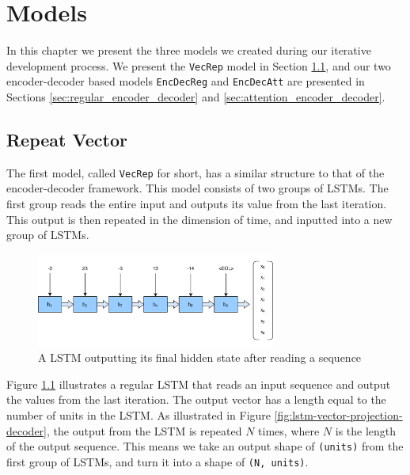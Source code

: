 
\chapter{Models}
\label{ch:models}
In this chapter we present the three models we created during our iterative development process. We present the {\tt VecRep} model in Section \ref{sec:repeat_vector}, and our two encoder-decoder based models {\tt EncDecReg} and {\tt EncDecAtt} are presented in Sections \ref{sec:regular_encoder_decoder} and \ref{sec:attention_encoder_decoder}.


\section{Repeat Vector}
\label{sec:repeat_vector}
The first model, called {\tt VecRep} for short, has a similar structure to that of the encoder-decoder framework. This model consists of two groups of LSTMs. The first group reads the entire input and outputs its value from the last iteration. This output is then repeated in the dimension of time, and inputted into a new group of LSTMs.

\begin{figure}[ht]
    \centering
    \includegraphics[width=0.7\textwidth]{fig/development_process/lstm-vector-projection-encoder.png}
    \caption{A LSTM outputting its final hidden state after reading a sequence}
    \label{fig:lstm-vector-projection-encoder}
\end{figure}

Figure \ref{fig:lstm-vector-projection-encoder} illustrates a regular LSTM that reads an input sequence and output the values from the last iteration. The output vector has a length equal to the number of units in the LSTM. As illustrated in Figure \ref{fig:lstm-vector-projection-decoder}, the output from the LSTM is repeated \(N\) times, where \(N\) is the length of the output sequence. This means we take an output shape of {\tt (units)} from the first group of LSTMs, and turn it into a shape of {\tt (N, units)}.


